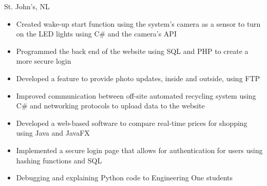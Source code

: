 \documentclass[10pt,a4paper]{altacv}
\begin{document}
\divider

 {St. John's, NL}

\begin{itemize}
\item Created wake-up start function using the system’s camera as a sensor to turn on the LED lights using C\# and the camera’s API
\item Programmed the back end of the website using SQL and PHP to create a more secure login
\item Developed a feature to provide photo updates, inside and outside, using FTP
\item Improved communication between off-site automated recycling system using C\# and networking protocols to upload data to the website
\end{itemize}


\begin{itemize}
    \item Developed a web-based software to compare real-time prices for shopping using Java and JavaFX
    \item Implemented a secure login page that allows for authentication for users using hashing functions and SQL
\end{itemize}

{}

\begin{itemize}
\item Debugging and explaining Python code to Engineering One students
\end{itemize}

\medskip









\end{document}
